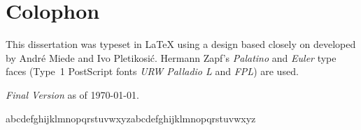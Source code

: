 \pagestyle{empty}

\hfill

\vfill


\section*{Colophon}
This dissertation was typeset in \LaTeX{}  using a design based closely on \texttt{\classicthesis} developed by Andr\'e Miede and Ivo Pletikosić.
Hermann Zapf's \emph{Palatino} and \emph{Euler} type faces (Type~1 PostScript fonts \emph{URW Palladio L} and \emph{FPL}) are used.

\bigskip

\noindent
\textit{Final Version} as of \today.




% 
% 
\noindent
abcdefghijklmnopqrstuvwxyzabcdefghijklmnopqrstuvwxyz
   


\newlength{\abcd}
   \settowidth{\abcd}{abcdefghijklmnopqrstuvwxyz}
\the\abcd\ %
